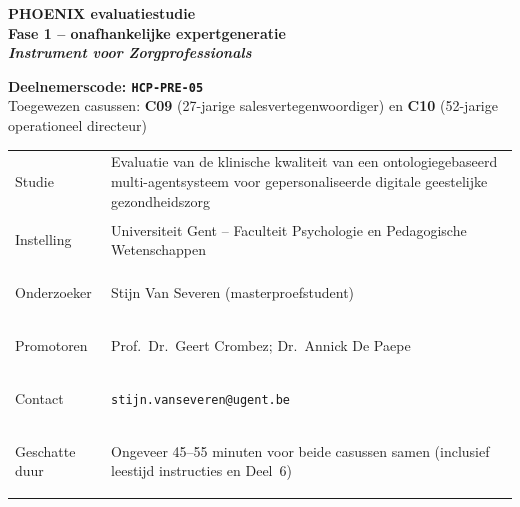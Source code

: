 \documentclass[11pt,a4paper]{article}
\renewcommand{\arraystretch}{1.28}
\begin{document}
\thispagestyle{fancy}
\vspace*{0.3cm}

\begin{tcolorbox}[
  colback=DarkBlue,colframe=DarkBlue,
  arc=3mm,left=14pt,right=14pt,top=12pt,bottom=12pt,
  width=\textwidth
]
\centering
{\fontsize{22}{28}\selectfont\bfseries\color{white}
PHOENIX evaluatiestudie\\[0.3em]
\fontsize{15}{20}\selectfont\color{AccentBlue}
Fase 1 -- onafhankelijke expertgeneratie\\[0.2em]
\fontsize{12}{16}\selectfont\color{white}
\textit{Instrument voor Zorgprofessionals}
}
\end{tcolorbox}

\vspace{0.6cm}

\begin{center}
\begin{tcolorbox}[
  colback=AccentBlue,colframe=PrimaryBlue,
  arc=2.5mm,boxrule=1.2pt,left=12pt,right=12pt,top=10pt,bottom=10pt,
  width=0.86\textwidth
]
\centering
{\large\bfseries\color{DarkBlue}Deelnemerscode: \texttt{HCP-PRE-05}}\\[0.5em]
{\normalsize\color{SlateMid}
Toegewezen casussen:\quad
\textbf{\color{PrimaryBlue}C09} (27-jarige salesvertegenwoordiger)
\quad en \quad
\textbf{\color{PrimaryBlue}C10} (52-jarige operationeel directeur)
}
\end{tcolorbox}
\end{center}

\vspace{0.5cm}

\begin{center}
\begin{tcolorbox}[
  colback=SoftBG,colframe=BorderGrey,
  arc=2mm,left=10pt,right=10pt,top=9pt,bottom=9pt,
  width=0.92\textwidth
]
\small\renewcommand{\arraystretch}{1.28}
\begin{tabularx}{\textwidth}{@{}>{\bfseries\raggedright\arraybackslash}p{}X@{}}
Studie & Evaluatie van de klinische kwaliteit van een ontologiegebaseerd multi-agentsysteem voor gepersonaliseerde digitale geestelijke gezondheidszorg \\
Instelling & Universiteit Gent -- Faculteit Psychologie en Pedagogische Wetenschappen \\
Onderzoeker & Stijn Van Severen (masterproefstudent) \\
Promotoren & Prof.\ Dr.\ Geert Crombez; Dr.\ Annick De Paepe \\
Contact & \texttt{stijn.vanseveren@ugent.be} \\
Geschatte duur & Ongeveer 45--55 minuten voor beide casussen samen (inclusief leestijd instructies en Deel~6) \\
\end{tabularx}
\end{tcolorbox}
\end{center}
\end{document}
